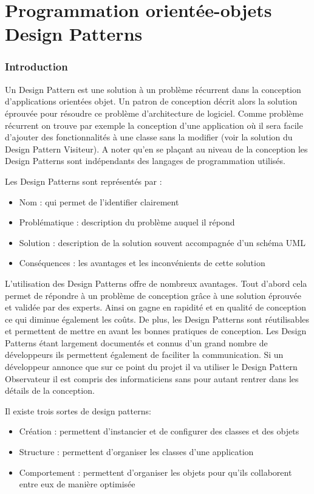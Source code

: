 \part{Programmation orientée-objets \\Design Patterns}
\section{Introduction}

Un Design Pattern est une solution à un problème récurrent dans la conception d’applications orientées objet. Un patron de conception décrit alors la solution éprouvée pour résoudre ce problème d’architecture de logiciel. Comme problème récurrent on trouve par exemple la conception d’une application où il sera facile d’ajouter des fonctionnalités à une classe sans la modifier (voir la solution du Design Pattern Visiteur). A noter qu’en se plaçant au niveau de la conception les Design Patterns sont indépendants des langages de programmation utilisés. 

Les Design Patterns sont représentés par :

\begin{itemize}
    \item Nom : qui permet de l’identifier clairement
    \item Problématique : description du problème auquel il répond
    \item Solution : description de la solution souvent accompagnée d’un schéma UML
    \item Conséquences : les avantages et les inconvénients de cette solution
\end{itemize}

L’utilisation des Design Patterns offre de nombreux avantages. Tout d’abord cela permet de répondre à un problème de conception grâce à une solution éprouvée et validée par des experts. Ainsi on gagne en rapidité et en qualité de conception ce qui diminue également les coûts. De plus, les Design Patterns sont réutilisables et permettent de mettre en avant les bonnes pratiques de conception.
Les Design Patterns étant largement documentés et connus d’un grand nombre de développeurs ils permettent également de faciliter la communication. Si un développeur annonce que sur ce point du projet il va utiliser le Design Pattern Observateur il est compris des informaticiens sans pour autant rentrer dans les détails de la conception.

Il existe trois sortes de design patterns: 
\begin{itemize}
    \item Création : permettent d’instancier et de configurer des classes et des objets
    \item Structure : permettent d’organiser les classes d’une application
    \item Comportement : permettent d'organiser les objets pour qu’ils collaborent entre eux de manière optimisée
\end{itemize}





